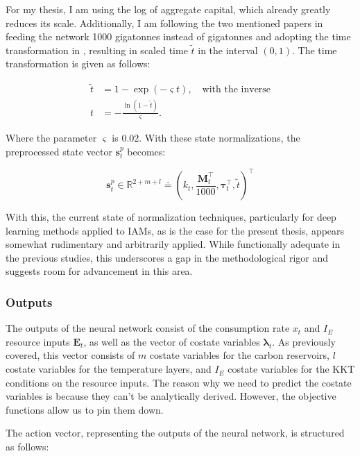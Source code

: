 For my thesis, I am using the log of aggregate capital, which already greatly reduces its scale. Additionally, I am following the two mentioned papers in feeding the network 1000 gigatonnes instead of gigatonnes and adopting the time transformation in \textcite{Traeger2014timetrafo}, resulting in scaled time \(\tilde t\) in the interval \((0,1)\). The time transformation is given as follows:

\begin{equation}
\begin{aligned}
    \tilde t &= 1-\exp(-\varsigma t), \quad \text{with the inverse} \\
    t &= -\frac{\ln(1-\tilde t)}{\varsigma}.
\end{aligned}
\end{equation}

Where the parameter \(\varsigma\) is \(0.02\). With these state normalizations, the preprocessed state vector \(\bm{s}_t^p\) becomes:

\begin{equation}
    \bm{s}_t^p \in \mathbb{R}^{2+m+l} \doteq \left (k_t, \frac{\bm{M}_t^\top}{1000}, \bm{\tau}_t^\top, \tilde t \right )^\top 
\end{equation}

With this, the current state of normalization techniques, particularly for deep learning methods applied to IAMs, as is the case for the present thesis, appears somewhat rudimentary and arbitrarily applied. While functionally adequate in the previous studies, this underscores a gap in the methodological rigor and suggests room for advancement in this area.


\subsubsection{Outputs}

The outputs of the neural network consist of the consumption rate \(x_t\) and \(I_E\) resource inputs \(\bm{E}_t\), as well as the vector of costate variables \(\bm{\lambda}_t\). As previously covered, this vector consists of \(m\) costate variables for the carbon reservoirs, \(l\) costate variables for the temperature layers, and \(I_E\) costate variables for the KKT conditions on the resource inputs. The reason why we need to predict the costate variables is because they can't be analytically derived. However, the objective functions allow us to pin them down. 

The action vector, representing the outputs of the neural network, is structured as follows: 

